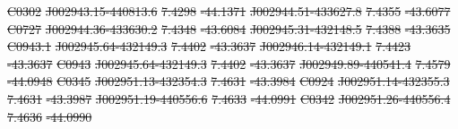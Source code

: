 \documentclass[11pt, a4paper]{book}
\providecommand{\DIFdeltex}[1]{{\protect\color{red}\sout{#1}}}                      %
\providecommand{\DIFdel}[1]{\texorpdfstring{\DIFdeltex{#1}}{}} %
\begin{document}
\DIFdel{C0302 }%
\DIFdel{J002943.15-440813.6 }%
\DIFdel{7.4298 }%
\DIFdel{-44.1371 }%
\DIFdel{J002944.51-433627.8 }%
\DIFdel{7.4355 }%
\DIFdel{-43.6077 }%
\DIFdel{C0727 }%
\DIFdel{J002944.36-433630.2 }%
\DIFdel{7.4348 }%
\DIFdel{-43.6084 }%
\DIFdel{J002945.31-432148.5 }%
\DIFdel{7.4388 }%
\DIFdel{-43.3635 }%
\DIFdel{C0943.1 }%
\DIFdel{J002945.64-432149.3 }%
\DIFdel{7.4402 }%
\DIFdel{-43.3637 }%
\DIFdel{J002946.14-432149.1 }%
\DIFdel{7.4423 }%
\DIFdel{-43.3637 }%
\DIFdel{C0943 }%
\DIFdel{J002945.64-432149.3 }%
\DIFdel{7.4402 }%
\DIFdel{-43.3637 }%
\DIFdel{J002949.89-440541.4 }%
\DIFdel{7.4579 }%
\DIFdel{-44.0948 }%
\DIFdel{C0345 }%
\DIFdel{J002951.13-432354.3 }%
\DIFdel{7.4631 }%
\DIFdel{-43.3984 }%
\DIFdel{C0924 }%
\DIFdel{J002951.14-432355.3 }%
\DIFdel{7.4631 }%
\DIFdel{-43.3987 }%
\DIFdel{J002951.19-440556.6 }%
\DIFdel{7.4633 }%
\DIFdel{-44.0991 }%
\DIFdel{C0342 }%
\DIFdel{J002951.26-440556.4 }%
\DIFdel{7.4636 }%
\DIFdel{-44.0990 }%
\end{document}
